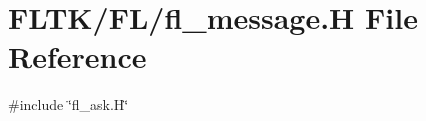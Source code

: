\hypertarget{fl__message_8_h}{}\section{F\+L\+T\+K/\+F\+L/fl\+\_\+message.H File Reference}
\label{fl__message_8_h}
{\ttfamily \#include \char`\"{}fl\+\_\+ask.\+H\char`\"{}}\newline
